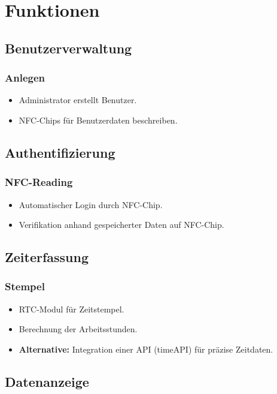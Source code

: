 \documentclass[../main.tex]{subfiles}
\begin{document}
\section{Funktionen}

\subsection{Benutzerverwaltung}

\subsubsection{Anlegen}
\begin{itemize}
  \item Administrator erstellt Benutzer.
  \item NFC-Chips für Benutzerdaten beschreiben.
\end{itemize}

\subsection{Authentifizierung}

\subsubsection{NFC-Reading}
\begin{itemize}
  \item Automatischer Login durch NFC-Chip.
  \item Verifikation anhand gespeicherter Daten auf NFC-Chip.
\end{itemize}

\subsection{Zeiterfassung}

\subsubsection{Stempel}
\begin{itemize}
  \item RTC-Modul für Zeitstempel.
  \item Berechnung der Arbeitsstunden.
  \item \textbf{Alternative:} Integration einer API (timeAPI) für präzise Zeitdaten.
\end{itemize}

\subsection{Datenanzeige}
\end{document}
